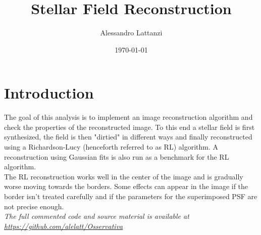 \documentclass[a4paper]{article}
\title{Stellar Field Reconstruction}
\author{Alessandro Lattanzi}
\date{\today}
\begin{document}
	\maketitle
	
	\section{Introduction}
	The goal of this analysis is to implement an image reconstruction algorithm and check the properties of the reconstructed image. To this end a stellar field is first synthesized, the field is then "dirtied" in different ways and finally reconstructed using a Richardson-Lucy (henceforth referred to as RL) algorithm. A reconstruction using Gaussian fits is also run as a benchmark for the RL algorithm.\\
	The RL reconstruction works well in the center of the image and is gradually worse moving towards the borders. Some effects can appear in the image if the border isn't treated carefully and if the parameters for the superimposed PSF are not precise enough.\\
	\newline
	\textit{The full commented code and source material is available at \url{https://github.com/alelatt/Osservativa}}
	
	\vspace{0.035\textheight}
\end{document}
